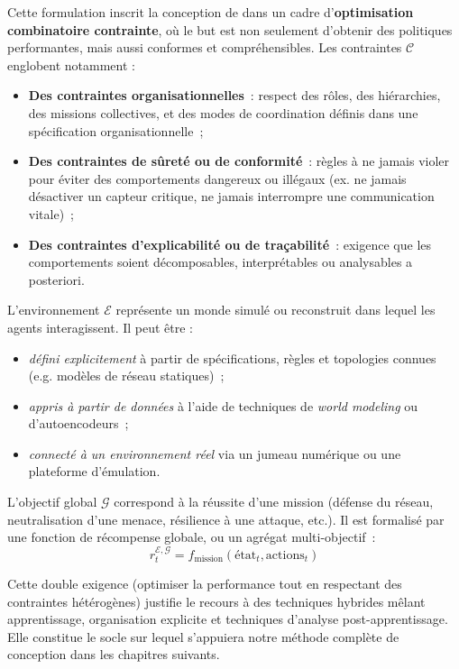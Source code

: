 \noindent
Cette formulation inscrit la conception de  dans un cadre d’\textbf{optimisation combinatoire contrainte}, où le but est non seulement d’obtenir des politiques performantes, mais aussi conformes et compréhensibles.
%
Les contraintes $\mathcal{C}$ englobent notamment :
\begin{itemize}
  \item \textbf{Des contraintes organisationnelles}~: respect des rôles, des hiérarchies, des missions collectives, et des modes de coordination définis dans une spécification organisationnelle~;
  \item \textbf{Des contraintes de sûreté ou de conformité}~: règles à ne jamais violer pour éviter des comportements dangereux ou illégaux (ex. ne jamais désactiver un capteur critique, ne jamais interrompre une communication vitale)~;
  \item \textbf{Des contraintes d’explicabilité ou de traçabilité}~: exigence que les comportements soient décomposables, interprétables ou analysables a posteriori.
\end{itemize}
%
L’environnement $\mathcal{E}$ représente un monde simulé ou reconstruit dans lequel les agents interagissent. Il peut être :
\begin{itemize}
  \item \emph{défini explicitement} à partir de spécifications, règles et topologies connues (e.g. modèles de réseau statiques)~;
  \item \emph{appris à partir de données} à l’aide de techniques de \textit{world modeling} ou d’autoencodeurs~;
  \item \emph{connecté à un environnement réel} via un jumeau numérique ou une plateforme d’émulation.
\end{itemize}

\noindent L’objectif global $\mathcal{G}$ correspond à la réussite d’une mission (défense du réseau, neutralisation d’une menace, résilience à une attaque, etc.). Il est formalisé par une fonction de récompense globale, ou un agrégat multi-objectif~:
\[
  r^{\mathcal{E}, \mathcal{G}}_t = f_{\text{mission}}(\text{état}_t, \text{actions}_t)
\]

\noindent
Cette double exigence (optimiser la performance tout en respectant des contraintes hétérogènes) justifie le recours à des techniques hybrides mêlant apprentissage, organisation explicite et techniques d’analyse post-apprentissage. Elle constitue le socle sur lequel s’appuiera notre méthode complète de conception dans les chapitres suivants.

